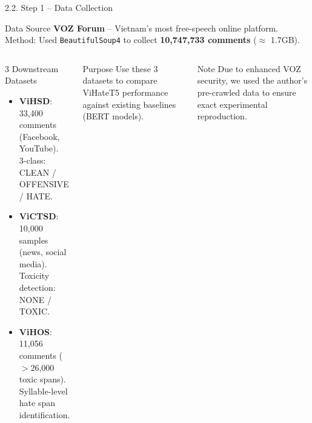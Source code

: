 \documentclass[11pt, aspectratio=169]{beamer}
\begin{document}
\begin{frame}[fragile, shrink=20]{2.2. Step 1 -- Data Collection}

\begin{block}{Data Source}
  \textbf{VOZ Forum} -- Vietnam's most free-speech online platform.\\
  Method: Used \texttt{BeautifulSoup4} to collect \textbf{10,747,733 comments} ($\approx$ 1.7GB).
\end{block}

\vspace{0.2cm}
\begin{columns}[T]
  \begin{block}{3 Downstream Datasets}
    \begin{itemize}
      \item \textbf{ViHSD}: 33,400 comments (Facebook, YouTube).\\
        3-class: CLEAN / OFFENSIVE / HATE.
      \item \textbf{ViCTSD}: 10,000 samples (news, social media).\\
        Toxicity detection: NONE / TOXIC.
      \item \textbf{ViHOS}: 11,056 comments ($>$26,000 toxic spans).\\
        Syllable-level hate span identification.
    \end{itemize}
  \end{block}

  \begin{block}{Purpose}
    Use these 3 datasets to compare ViHateT5 performance against existing baselines (BERT models).
  \end{block}

  \vspace{0.3cm}
  \begin{block}{Note}
    Due to enhanced VOZ security, we used the author's pre-crawled data to ensure exact experimental reproduction.
  \end{block}
\end{columns}
\end{frame}
\end{document}
